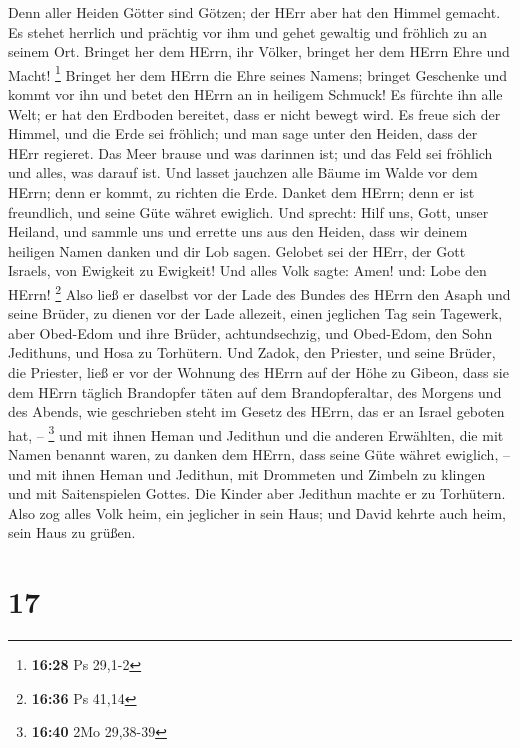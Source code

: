  Denn aller Heiden Götter sind Götzen; der HErr aber hat
den Himmel gemacht.  Es stehet herrlich und prächtig vor
ihm und gehet gewaltig und fröhlich zu an seinem Ort. 
Bringet her dem HErrn, ihr Völker, bringet her dem HErrn Ehre und Macht!
\footnote{\textbf{16:28} Ps 29,1-2}  Bringet her dem
HErrn die Ehre seines Namens; bringet Geschenke und kommt vor ihn und
betet den HErrn an in heiligem Schmuck!  Es fürchte ihn
alle Welt; er hat den Erdboden bereitet, dass er nicht bewegt wird.
 Es freue sich der Himmel, und die Erde sei fröhlich; und
man sage unter den Heiden, dass der HErr regieret.  Das
Meer brause und was darinnen ist; und das Feld sei fröhlich und alles,
was darauf ist.  Und lasset jauchzen alle Bäume im Walde
vor dem HErrn; denn er kommt, zu richten die Erde. 
Danket dem HErrn; denn er ist freundlich, und seine Güte währet
ewiglich.  Und sprecht: Hilf uns, Gott, unser Heiland,
und sammle uns und errette uns aus den Heiden, dass wir deinem heiligen
Namen danken und dir Lob sagen.  Gelobet sei der HErr,
der Gott Israels, von Ewigkeit zu Ewigkeit! Und alles Volk sagte: Amen!
und: Lobe den HErrn! \footnote{\textbf{16:36} Ps 41,14} 
Also ließ er daselbst vor der Lade des Bundes des HErrn den Asaph und
seine Brüder, zu dienen vor der Lade allezeit, einen jeglichen Tag sein
Tagewerk,  aber Obed-Edom und ihre Brüder,
achtundsechzig, und Obed-Edom, den Sohn Jedithuns, und Hosa zu
Torhütern.  Und Zadok, den Priester, und seine Brüder,
die Priester, ließ er vor der Wohnung des HErrn auf der Höhe zu Gibeon,
 dass sie dem HErrn täglich Brandopfer täten auf dem
Brandopferaltar, des Morgens und des Abends, wie geschrieben steht im
Gesetz des HErrn, das er an Israel geboten hat, -- \footnote{\textbf{16:40}
  2Mo 29,38-39}  und mit ihnen Heman und Jedithun und die
anderen Erwählten, die mit Namen benannt waren, zu danken dem HErrn,
dass seine Güte währet ewiglich, --  und mit ihnen Heman
und Jedithun, mit Drommeten und Zimbeln zu klingen und mit Saitenspielen
Gottes. Die Kinder aber Jedithun machte er zu Torhütern. 
Also zog alles Volk heim, ein jeglicher in sein Haus; und David kehrte
auch heim, sein Haus zu grüßen.

\hypertarget{section-16}{%
\section{17}\label{section-16}}

